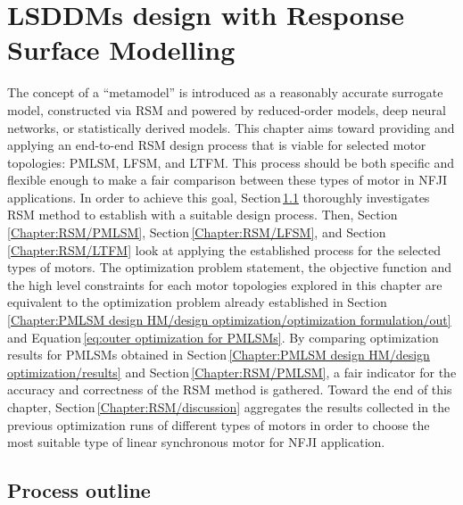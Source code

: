 \chapter{\acsp{LSDDM} design with Response Surface Modelling}   \label{Chapter:PMLSM design RSM}


    The concept of a “metamodel” is introduced as a reasonably accurate surrogate model, constructed via \acf{RSM} and powered by reduced-order models, deep neural networks, or statistically derived models. This chapter aims toward providing and applying an end-to-end \acs{RSM} design process that is viable for selected motor topologies: \acf{PMLSM}, \acf{LFSM}, and \acf{LTFM}. This process should be both specific and flexible enough to make a fair comparison between these types of motor in \acs{NFJI} applications. In order to achieve this goal, Section\,\ref{Chapter:RSM/outline} thoroughly investigates \acs{RSM} method to establish with a suitable design process. Then, Section\,\ref{Chapter:RSM/PMLSM}, Section\,\ref{Chapter:RSM/LFSM}, and Section\,\ref{Chapter:RSM/LTFM} look at applying the established process for the selected types of motors. The optimization problem statement, the objective function and the high level constraints for each motor topologies explored in this chapter are equivalent to the optimization problem already established in Section\,\ref{Chapter:PMLSM design HM/design optimization/optimization formulation/out} and Equation\,\ref{eq:outer optimization for PMLSMs}. By comparing optimization results for \acsp{PMLSM} obtained in Section\,\ref{Chapter:PMLSM design HM/design optimization/results} and Section\,\ref{Chapter:RSM/PMLSM}, a fair indicator for the accuracy and correctness of the \ac{RSM} method is gathered. Toward the end of this chapter, Section\,\ref{Chapter:RSM/discussion} aggregates the results collected in the previous optimization runs of different types of motors in order to choose the most suitable type of linear synchronous motor for \acs{NFJI} application.


    \section{Process outline}                        \label{Chapter:RSM/outline}
    
